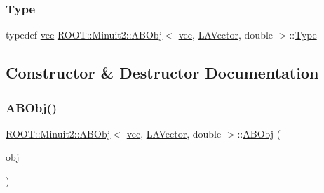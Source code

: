 \subsubsection{\texorpdfstring{Type}{Type}\hspace{0.1cm}{\footnotesize\ttfamily [2/2]}}
{\footnotesize\ttfamily typedef \mbox{\hyperlink{classROOT_1_1Minuit2_1_1vec}{vec}} \mbox{\hyperlink{classROOT_1_1Minuit2_1_1ABObj}{R\+O\+O\+T\+::\+Minuit2\+::\+A\+B\+Obj}}$<$ \mbox{\hyperlink{classROOT_1_1Minuit2_1_1vec}{vec}}, \mbox{\hyperlink{classROOT_1_1Minuit2_1_1LAVector}{L\+A\+Vector}}, double $>$\+::\mbox{\hyperlink{classROOT_1_1Minuit2_1_1ABObj_3_01vec_00_01LAVector_00_01double_01_4_a4b4f01cea6a833a82f65ddadd8cb0f40}{Type}}}



\subsection{Constructor \& Destructor Documentation}
\mbox{\label{classROOT_1_1Minuit2_1_1ABObj_3_01vec_00_01LAVector_00_01double_01_4_a3b8232d5f2becc9d30bcbc5ad933e41a}} 
\subsubsection{\texorpdfstring{ABObj()}{ABObj()}\hspace{0.1cm}{\footnotesize\ttfamily [1/6]}}
{\footnotesize\ttfamily \mbox{\hyperlink{classROOT_1_1Minuit2_1_1ABObj}{R\+O\+O\+T\+::\+Minuit2\+::\+A\+B\+Obj}}$<$ \mbox{\hyperlink{classROOT_1_1Minuit2_1_1vec}{vec}}, \mbox{\hyperlink{classROOT_1_1Minuit2_1_1LAVector}{L\+A\+Vector}}, double $>$\+::\mbox{\hyperlink{classROOT_1_1Minuit2_1_1ABObj}{A\+B\+Obj}} (\begin{DoxyParamCaption}\item[{const \mbox{\hyperlink{classROOT_1_1Minuit2_1_1LAVector}{L\+A\+Vector}} \&}]{obj }\end{DoxyParamCaption})\hspace{0.3cm}{\ttfamily [inline]}}

\mbox{\label{classROOT_1_1Minuit2_1_1ABObj_3_01vec_00_01LAVector_00_01double_01_4_a809b8940cc6667e7171d180577cea95d}} 
